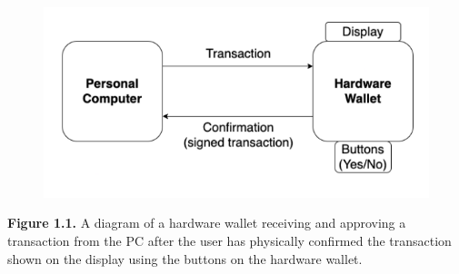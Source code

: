 \documentclass[]{article}
\begin{document}
\begin{figure}
\centering
\includegraphics{Hardware-Wallet-Diagram.png}
\caption{}
\end{figure}

\textbf{Figure 1.1.} A diagram of a hardware wallet receiving and
approving a transaction from the PC after the user has physically
confirmed the transaction shown on the display using the buttons on the
hardware wallet.
\end{document}
